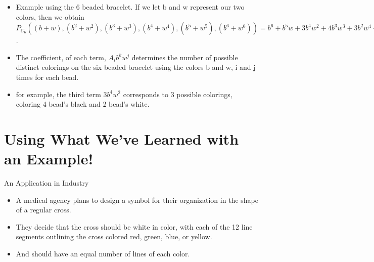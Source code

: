 \documentclass{beamer}
\newcommand{\bracelet}[2][]{
\ifthenelse{\isempty{#1}}{\directlua{bracelet(#2)}}{\directlua{bracelet(#2,#1)}}} %
\begin{document}
\begin{frame}
\begin{itemize}

\pause
\item Example using the 6 beaded bracelet. If we let b and w represent our two colors, then we obtain $P_{C_{6}}((b+w), (b^2+w^2), (b^3+w^3), (b^4+w^4), (b^5+w^5), (b^6+w^6)) = b^6 + b^5w + 3b^4w^2 + 4b^3w^3 + 3b^2w^4 + bw^5 + w^6$.

\pause
\item The coefficient, of each term, $A_{i}b^{k}w^{j}$ determines the number of possible distinct colorings on the six beaded bracelet using the colors b and w, i and j times for each bead.

\pause
\item for example, the third term $3b^4w^2$ corresponds to 3 possible colorings, coloring 4 bead's black and 2 bead's white.
\vspace{2em}
\begin{center}
\end{center}
\end{itemize}
\end{frame}

\section{Using What We've Learned with an Example!}

\begin{frame}{An Application in Industry}
  \begin{itemize}
    \item A medical agency plans to design a symbol for their organization in the shape of a regular cross.
    \item They decide that the cross should be white in color, with each of the 12 line segments outlining the cross colored red, green, blue, or yellow.
    \item And should have an equal number of lines of each color.
  \end{itemize}
\end{frame}
\end{document}
